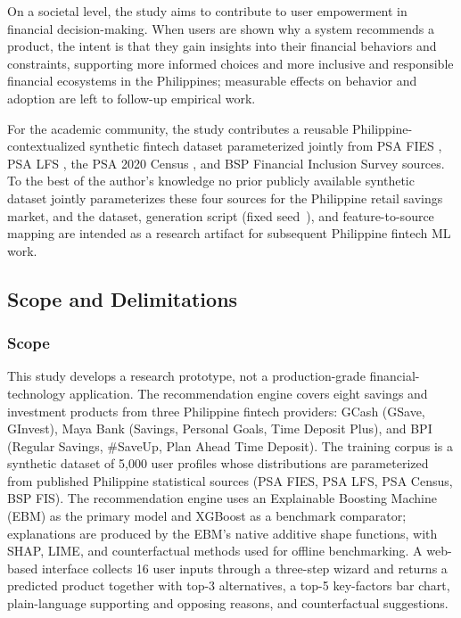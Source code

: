 \documentclass[journal]{./IEEE/IEEEtran}
\begin{document}
On a societal level, the study aims to contribute to user empowerment in financial decision-making. When users are shown why a system recommends a product, the intent is that they gain insights into their financial behaviors and constraints, supporting more informed choices and more inclusive and responsible financial ecosystems in the Philippines; measurable effects on behavior and adoption are left to follow-up empirical work.

For the academic community, the study contributes a reusable Philippine-contextualized synthetic fintech dataset parameterized jointly from PSA FIES \cite{ref40}, PSA LFS \cite{ref41}, the PSA 2020 Census \cite{ref39}, and BSP Financial Inclusion Survey \cite{ref35} sources. To the best of the author's knowledge no prior publicly available synthetic dataset jointly parameterizes these four sources for the Philippine retail savings market, and the dataset, generation script (fixed seed~\cite{ref60}), and feature-to-source mapping are intended as a research artifact for subsequent Philippine fintech ML work.

\subsection{Scope and Delimitations}

\subsubsection{Scope}

This study develops a research prototype, not a production-grade financial-technology application. The recommendation engine covers eight savings and investment products from three Philippine fintech providers: GCash (GSave, GInvest), Maya Bank (Savings, Personal Goals, Time Deposit Plus), and BPI (Regular Savings, \#SaveUp, Plan Ahead Time Deposit). The training corpus is a synthetic dataset of 5{,}000 user profiles whose distributions are parameterized from published Philippine statistical sources (PSA FIES, PSA LFS, PSA Census, BSP FIS). The recommendation engine uses an Explainable Boosting Machine (EBM) as the primary model and XGBoost as a benchmark comparator; explanations are produced by the EBM's native additive shape functions, with SHAP, LIME, and counterfactual methods used for offline benchmarking. A web-based interface collects 16 user inputs through a three-step wizard and returns a predicted product together with top-3 alternatives, a top-5 key-factors bar chart, plain-language supporting and opposing reasons, and counterfactual suggestions.
\end{document}
